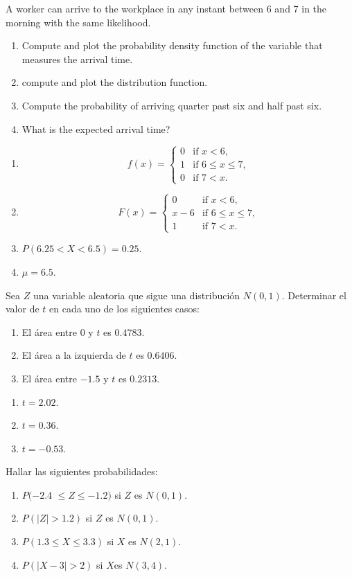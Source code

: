 {A worker can arrive to the workplace in any instant between 6 and 7 in the morning with the same likelihood. 
\begin{enumerate}
\item Compute and plot the probability density function of the variable that measures the arrival time.
\item compute and plot the distribution function. 
\item Compute the probability of arriving quarter past six and half past six.
\item What is the expected arrival time?
\end{enumerate}
}
{
\begin{enumerate}
\item \[
f(x)=
\begin{cases}
0 & \mbox{if $x<6$,}\\
1 & \mbox{if $6\leq x\leq 7$,}\\
0 & \mbox{if $7<x$.}
\end{cases}
\]
\item \[
F(x)=
\begin{cases}
0 & \mbox{if $x<6$,}\\
x-6 & \mbox{if $6\leq x\leq 7$,}\\
1 & \mbox{if $7<x$.}
\end{cases}
\]
\item $P(6.25<X<6.5)=0.25$.
\item $\mu=6.5$.
\end{enumerate}
}
{}


{Sea $Z$ una variable aleatoria que sigue una distribución $N(0,1)$.
Determinar el valor de $t$ en cada uno de los siguientes casos: 
\begin{enumerate}
\item El área entre $0$ y $t$ es $0.4783$.
\item El área a la izquierda de $t$ es $0.6406$.
\item El área entre $-1.5$ y $t$ es $0.2313$.
\end{enumerate}
}
{
\begin{enumerate}
\item $t=2.02$.
\item $t=0.36$.
\item $t=-0.53$.
\end{enumerate}
}
{}


{Hallar las siguientes probabilidades:

\begin{enumerate}
\item  $P(-2.4$ $\leq Z\leq -1.2)$ si $Z$ es $N(0,1)$.
\item  $P(\left| Z\right| >1.2)$ si $Z$ es $N(0,1)$.
\item  $P(1.3\leq X\leq 3.3)$ si $X$ es $N(2,1)$.
\item  $P(\left| X-3\right| >2)$ si $X$es $N(3,4)$.
\end{enumerate}
}
{}
{}



